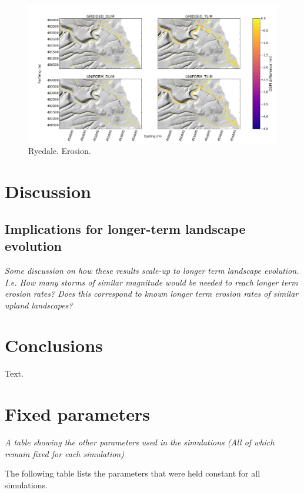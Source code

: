 \begin{figure}
\includegraphics[width=22cm]{chp06_figures_scripts/figure_ryedale_erosion_diff_ensemble30.jpg}
\caption{Ryedale. Erosion.}
\label{fig_ryedale_2dplan_erosion_ensemble}
\end{figure}

\section{Discussion}

\subsection{Implications for longer-term landscape evolution}
\textit{Some discussion on how these results scale-up to longer term landscape evolution. I.e. How many storms of similar magnitude would be needed to reach longer term erosion rates? Does this correspond to known longer term erosion rates of similar upland landscapes?}

\section{Conclusions}  %
Text.



\section{Fixed parameters}

\textit{A table showing the other parameters used in the simulations (All of which remain fixed for each simulation)}

The following table lists the parameters that were held constant for all simulations.
